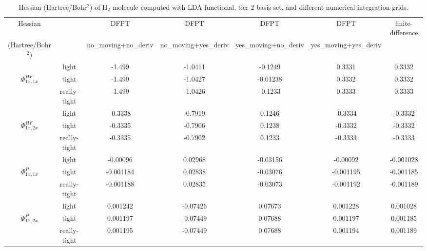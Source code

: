 \documentclass[journal=jpca,manuscript=article]{achemso}
\begin{document}
\begin{table*}
\scalebox{0.6}
{
\begin{tabular}{c  c  |   c | c |c | c| c}
\hline \hline  
  Hessian  &         &  DFPT     &  DFPT & DFPT & DFPT  &  finite-difference   \\
  (Hartree/Bohr$^2$)            &   & no\_moving+no\_deriv   & no\_moving+yes\_deriv  & yes\_moving+no\_deriv   & yes\_moving+yes\_deriv   \\  
\hline 
                     &  light     & -1.499  & -1.0411 & -0.1249    & 0.3331  & 0.3332\\ 
$\Phi^{HF}_{1x,1x}$  &  tight     & -1.499  &  -1.0427 & -0.01238    & 0.3332  & 0.3332   \\
                     &  really-tight & -1.499 & -1.0426 &  -0.1233   &  0.3333 & 0.3333 \\
\hline
                    &  light     & -0.3338  & -0.7919 &  0.1246   & -0.3334 &  -0.3332   \\ 
$\Phi^{HF}_{1x,2x}$  &  tight     & -0.3335 & -0.7906 &  0.1238  & -0.3332  & -0.3332 \\
             &  really-tight     & -0.3335 &  -0.7902 & 0.1233    & -0.3333  & -0.3333   \\
\hline             
                    &  light     & -0.00096  & 0.02968 & -0.03156   & -0.00092 & -0.001028    \\ 
$\Phi^{P}_{1x,1x}$  &  tight     &  -0.001184 & 0.02838 & -0.03076 & -0.001195  & -0.001185   \\
                &  really-tight  & -0.001188 & 0.02835 & -0.03073   & -0.001192  & -0.001189  \\
\hline 
                   &  light     &   0.001242 & -0.07426 & 0.07673  &0.001228   & 0.001028 \\ 
$\Phi^{P}_{1x,2x}$  &  tight     & 0.001197  &  -0.07449 & 0.07688  & 0.001197  & 0.001185   \\
                 &  really-tight &  0.001195 & -0.07449 & 0.07688    & 0.001194  & 0.001189  \\
                 \hline   \hline        
\end{tabular}
}
\caption{Hessian (Hartree/Bohr$^2$) of H$_2$ molecule computed with LDA functional, tier 2 basis set, and different  numerical integration grids. }
\label{tab:H-grid_test_FC}
\end{table*}
\end{document}
